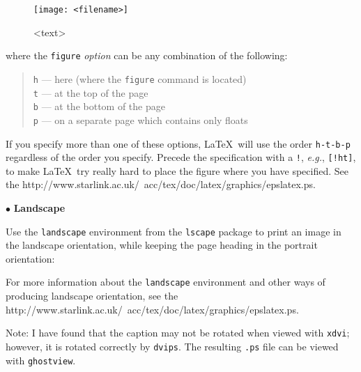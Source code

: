 \documentclass[11pt,twoside,nolof]{starlink}
\begin{document}
\begin{terminalv}
\begin{figure}[<option>]
   \centering
   \texttt{[image: <filename>]}
   \caption{<text>}
\end{figure}
\end{terminalv}

    where the \texttt{figure} \emph{option} can be any combination of the
    following:
    \begin{quote}
      \texttt{h} --- here (where the \texttt{figure} command is located)\\
      \texttt{t} --- at the top of the page\\
      \texttt{b} --- at the bottom of the page\\
      \texttt{p} --- on a separate page which contains only floats
    \end{quote}

    If you specify more than one of these options, \LaTeX\ will use the order
    \texttt{h-t-b-p} regardless of the order you specify.
    Precede the specification with a \texttt{!}, \emph{e.g.}, \texttt{[!ht]},
    to make \LaTeX\ try really hard to place the figure where you have
    specified.  See the
    {http://www.starlink.ac.uk/~acc/tex/doc/latex/graphics/epslatex.ps}\cite[part IV, section 10, p 36]{eps}.

$\bullet$ \textbf{Landscape}

    Use the \texttt{landscape} environment from the \texttt{lscape} package
    to print an image in the landscape orientation, while
    keeping the page heading in the portrait orientation:


    For more information about the \texttt{landscape} environment and other
    ways of producing landscape orientation, see the
    {http://www.starlink.ac.uk/~acc/tex/doc/latex/graphics/epslatex.ps}\cite[part IV, section 11, p 38-41]{eps}.

    Note: I have found that the caption may not be rotated when viewed with
    \texttt{xdvi}; however, it is rotated correctly by \texttt{dvips}. The
    resulting \texttt{.ps} file can be viewed with \texttt{ghostview}.
\end{document}
